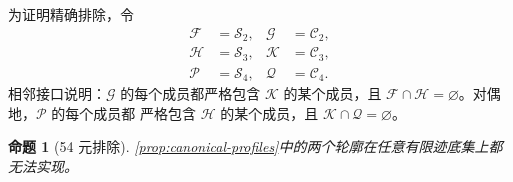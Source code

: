 \documentclass[UTF8,11pt,a4paper,fontset=fandol]{ctexart}
\newtheorem{proposition}[theorem]{命题}
\theoremstyle{definition}
\theoremstyle{remark}
\begin{document}
为证明精确排除，令
\[
\begin{aligned}
  \mathcal F&=\mathcal S_2,&\mathcal G&=\mathcal C_2,\\
  \mathcal H&=\mathcal S_3,&\mathcal K&=\mathcal C_3,\\
  \mathcal P&=\mathcal S_4,&\mathcal Q&=\mathcal C_4.
\end{aligned}
\]
相邻接口说明：$\mathcal G$ 的每个成员都严格包含 $\mathcal K$ 的某个成员，且
$\mathcal F\cap\mathcal H=\varnothing$。对偶地，$\mathcal P$ 的每个成员都
严格包含 $\mathcal H$ 的某个成员，且
$\mathcal K\cap\mathcal Q=\varnothing$。

\begin{proposition}[54 元排除]
\label{prop:exclude54}
\cref{prop:canonical-profiles}中的两个轮廓在任意有限迹底集上都无法实现。
\end{proposition}
\end{document}
